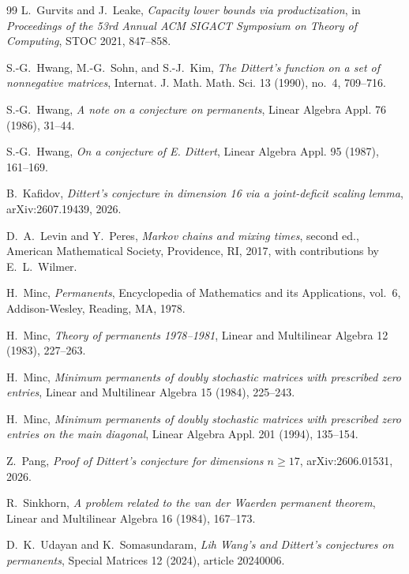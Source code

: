 \documentclass[11pt]{amsart}
\theoremstyle{definition}
\theoremstyle{remark}
\begin{document}
\begin{thebibliography}{99}
L.~Gurvits and J.~Leake,
\emph{Capacity lower bounds via productization},
in \emph{Proceedings of the 53rd Annual ACM SIGACT Symposium on Theory of
Computing}, STOC 2021, 847--858.

S.-G.~Hwang, M.-G.~Sohn, and S.-J.~Kim,
\emph{The Dittert's function on a set of nonnegative matrices},
Internat. J. Math. Math. Sci. 13 (1990), no.~4, 709--716.

S.-G.~Hwang,
\emph{A note on a conjecture on permanents},
Linear Algebra Appl. 76 (1986), 31--44.

S.-G.~Hwang,
\emph{On a conjecture of E. Dittert},
Linear Algebra Appl. 95 (1987), 161--169.

B.~Kafidov,
\emph{Dittert's conjecture in dimension 16 via a joint-deficit scaling
lemma},
arXiv:2607.19439, 2026.

D.~A.~Levin and Y.~Peres,
\emph{Markov chains and mixing times}, second ed.,
American Mathematical Society, Providence, RI, 2017,
with contributions by E.~L.~Wilmer.

H.~Minc,
\emph{Permanents},
Encyclopedia of Mathematics and its Applications, vol.~6,
Addison-Wesley, Reading, MA, 1978.

H.~Minc,
\emph{Theory of permanents 1978--1981},
Linear and Multilinear Algebra 12 (1983), 227--263.

H.~Minc,
\emph{Minimum permanents of doubly stochastic matrices with prescribed
zero entries},
Linear and Multilinear Algebra 15 (1984), 225--243.

H.~Minc,
\emph{Minimum permanents of doubly stochastic matrices with prescribed
zero entries on the main diagonal},
Linear Algebra Appl. 201 (1994), 135--154.

Z.~Pang,
\emph{Proof of Dittert's conjecture for dimensions \(n\geq17\)},
arXiv:2606.01531, 2026.

R.~Sinkhorn,
\emph{A problem related to the van der Waerden permanent theorem},
Linear and Multilinear Algebra 16 (1984), 167--173.

D.~K.~Udayan and K.~Somasundaram,
\emph{Lih Wang's and Dittert's conjectures on permanents},
Special Matrices 12 (2024), article 20240006.

\end{thebibliography}
\end{document}
